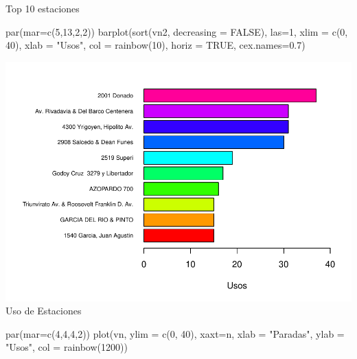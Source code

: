 \documentclass[
]{article}
\newenvironment{Shaded}{\begin{snugshade}}{\end{snugshade}}
\newcommand{\AttributeTok}[1]{\textcolor[rgb]{0.77,0.63,0.00}{#1}}
\newcommand{\ConstantTok}[1]{\textcolor[rgb]{0.00,0.00,0.00}{#1}}
\newcommand{\DecValTok}[1]{\textcolor[rgb]{0.00,0.00,0.81}{#1}}
\newcommand{\FloatTok}[1]{\textcolor[rgb]{0.00,0.00,0.81}{#1}}
\newcommand{\FunctionTok}[1]{\textcolor[rgb]{0.00,0.00,0.00}{#1}}
\newcommand{\NormalTok}[1]{#1}
\newcommand{\StringTok}[1]{\textcolor[rgb]{0.31,0.60,0.02}{#1}}
\begin{document}
Top 10 estaciones

\begin{Shaded}
\begin{Highlighting}[]
\FunctionTok{par}\NormalTok{(}\AttributeTok{mar=}\FunctionTok{c}\NormalTok{(}\DecValTok{5}\NormalTok{,}\DecValTok{13}\NormalTok{,}\DecValTok{2}\NormalTok{,}\DecValTok{2}\NormalTok{))}
\FunctionTok{barplot}\NormalTok{(}\FunctionTok{sort}\NormalTok{(vn2, }\AttributeTok{decreasing =} \ConstantTok{FALSE}\NormalTok{), }\AttributeTok{las=}\DecValTok{1}\NormalTok{, }\AttributeTok{xlim =} \FunctionTok{c}\NormalTok{(}\DecValTok{0}\NormalTok{, }\DecValTok{40}\NormalTok{), }\AttributeTok{xlab =} \StringTok{"Usos"}\NormalTok{, }\AttributeTok{col =} \FunctionTok{rainbow}\NormalTok{(}\DecValTok{10}\NormalTok{), }\AttributeTok{horiz =} \ConstantTok{TRUE}\NormalTok{, }\AttributeTok{cex.names=}\FloatTok{0.7}\NormalTok{)}
\end{Highlighting}
\end{Shaded}

\includegraphics{notebook_files/figure-latex/unnamed-chunk-2-1.pdf} Uso
de Estaciones

\begin{Shaded}
\begin{Highlighting}[]
\FunctionTok{par}\NormalTok{(}\AttributeTok{mar=}\FunctionTok{c}\NormalTok{(}\DecValTok{4}\NormalTok{,}\DecValTok{4}\NormalTok{,}\DecValTok{4}\NormalTok{,}\DecValTok{2}\NormalTok{))}
\FunctionTok{plot}\NormalTok{(vn, }\AttributeTok{ylim =} \FunctionTok{c}\NormalTok{(}\DecValTok{0}\NormalTok{, }\DecValTok{40}\NormalTok{), }\AttributeTok{xaxt=}\StringTok{\textquotesingle{}n\textquotesingle{}}\NormalTok{, }\AttributeTok{xlab =} \StringTok{"Paradas"}\NormalTok{, }\AttributeTok{ylab =} \StringTok{"Usos"}\NormalTok{, }\AttributeTok{col =} \FunctionTok{rainbow}\NormalTok{(}\DecValTok{1200}\NormalTok{))}
\end{Highlighting}
\end{Shaded}
\end{document}
